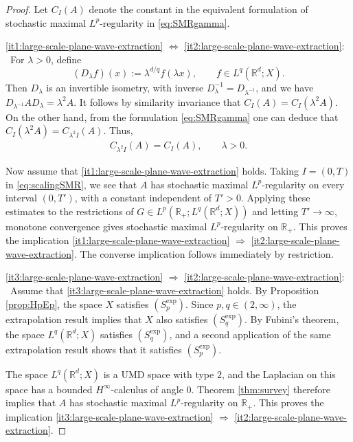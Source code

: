 \documentclass{amsart}
\theoremstyle{plain}
\theoremstyle{remark}
\theoremstyle{plain}
\numberwithin{equation}{section}
\newcommand{\R}{\mathbb R}
\newcommand{\1}{\mathbf 1}
\begin{document}
\begin{proof}
Let $C_I(A)$ denote the constant in the equivalent formulation of stochastic maximal $L^p$-regularity in \eqref{eq:SMRgamma}.

\smallskip
\ref{it1:large-scale-plane-wave-extraction} $\Leftrightarrow$ \ref{it2:large-scale-plane-wave-extraction}: \
For $\lambda>0$, define
\[
        (D_\lambda f)(x):=\lambda^{d/q}f(\lambda x),
        \qquad f\in L^q(\R^d;X).
\]
Then $D_\lambda$ is an invertible isometry, with inverse $D_\lambda^{-1} = D_{\lambda^{-1}}$, and we have \(D_{\lambda^{-1}}AD_\lambda=\lambda^2A\). It follows by similarity invariance that
$ C_I(A)=C_I(\lambda^2A).$
On the other hand, from the formulation \eqref{eq:SMRgamma} one can deduce that  $C_I(\lambda^2A)=C_{\lambda^2I}(A)$. Thus,
\begin{align}\label{eq:scalingSMR}
        C_{\lambda^2I}(A)=C_I(A),
        \qquad \lambda>0.
\end{align}

Now assume that \ref{it1:large-scale-plane-wave-extraction} holds. Taking $I=(0,T)$ in \eqref{eq:scalingSMR}, we see that $A$ has stochastic maximal $L^p$-regularity on every interval $(0,T')$, with a constant independent of $T'>0$. Applying these estimates to the restrictions of $G\in L^p(\R_+;L^q(\R^d;X))$ and letting $T'\to\infty$, monotone convergence gives stochastic maximal $L^p$-regularity on $\R_+$. This proves the implication \ref{it1:large-scale-plane-wave-extraction} $\Rightarrow$ \ref{it2:large-scale-plane-wave-extraction}. The converse implication follows immediately by restriction.

\smallskip
\ref{it3:large-scale-plane-wave-extraction} $\Rightarrow$ \ref{it2:large-scale-plane-wave-extraction}: \
Assume that \ref{it3:large-scale-plane-wave-extraction} holds. By Proposition \ref{prop:HpEp}, the space $X$ satisfies $(S_p^{\exp})$. Since $p,q\in(2,\infty)$, the extrapolation result \cite[Theorem 9.1]{LoVer} implies that $X$ also satisfies $(S_q^{\exp})$. By Fubini's theorem, the space $L^q(\R^d;X)$ satisfies $(S_q^{\exp})$, and a second application of the same extrapolation result shows that it satisfies $(S_p^{\exp})$.

The space $L^q(\R^d;X)$ is a UMD space with type $2$, and the Laplacian on this space has a bounded $H^\infty$-calculus of angle $0$. Theorem \ref{thm:survey} therefore implies that $A$ has stochastic maximal $L^p$-regularity on $\R_+$. This proves the implication \ref{it3:large-scale-plane-wave-extraction} $\Rightarrow$ \ref{it2:large-scale-plane-wave-extraction}.


\end{proof}
\end{document}
